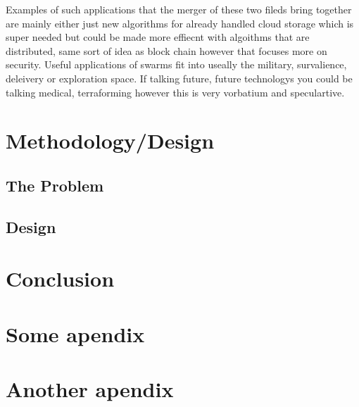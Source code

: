 \documentclass{UoYCSproject}
\begin{document}
Examples of such applications that the merger of these two fileds bring together are mainly either just new algorithms for already handled cloud storage which is super needed but could be made more effiecnt with algoithms that are distributed, same sort of idea as block chain however that focuses more on security.
Useful applications of swarms fit into useally the military, survalience, deleivery or exploration space.
If talking future, future technologys you could be talking medical, terraforming however this is very vorbatium and speculartive.


\chapter{Methodology/Design}
\label{cha:Methodology/Design}


\section{The Problem}
\label{sec:Problem}


\section{Design}
\label{sec:Design}



\chapter{Conclusion}
\label{cha:conclusion}


\appendix
\chapter{Some apendix}


\chapter{Another apendix}
\end{document}
